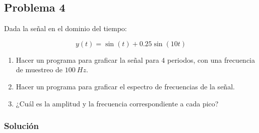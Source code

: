 \documentclass[a4paper,12pt,final]{article}
\begin{document}
  \newpage
  \subsection*{Problema 4}
    \noindent Dada la señal en el dominio del tiempo:

      $$y\left(t\right) = \sin\left(t\right) + 0.25\sin\left(10t\right)$$

      \begin{enumerate}[label=\alph*)]
        \item Hacer un programa para graficar la señal para $4$ periodos, con una frecuencia de muestreo de $100\ Hz$.
        \item Hacer un programa para graficar el espectro de frecuencias de la señal.
        \item ¿Cuál es la amplitud y la frecuencia correspondiente a cada pico?
      \end{enumerate}

    \subsubsection*{Solución}
\end{document}

